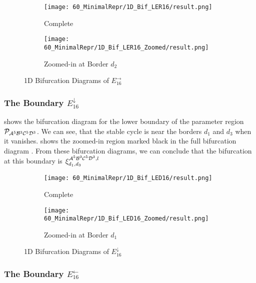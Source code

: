 \begin{figure}
    \centering
    \begin{subfigure}{0.4\textwidth}
        \centering
        \texttt{[image: 60\_MinimalRepr/1D\_Bif\_LER16/result.png]}
        \caption{Complete}
        \label{fig:final.bifurcation.E.right}
    \end{subfigure}
    \begin{subfigure}{0.4\textwidth}
        \centering
        \texttt{[image: 60\_MinimalRepr/1D\_Bif\_LER16\_Zoomed/result.png]}
        \caption{Zoomed-in at Border $d_2$}
        \label{fig:final.bifurcation.E.right.zoomed}
    \end{subfigure}
    \caption{1D Bifurcation Diagrams of $E_{16}^\rightarrow$}
\end{figure}

\subsubsection{The Boundary $E_{16}^\downarrow$}

 shows the bifurcation diagram for the lower boundary of the parameter region $\mathcal{P}_{\mathcal{A}^5\mathcal{B}^3\mathcal{C}^5\mathcal{D}^3}$.
We can see, that the stable cycle is near the borders $d_1$ and $d_3$ when it vanishes.
 shows the zoomed-in region marked black in the full bifurcation diagram .
From these bifurcation diagrams, we can conclude that the bifurcation at this boundary is $\xi_{d_1, d_3}^{\mathcal{A}^5\mathcal{B}^3\mathcal{C}^5\mathcal{D}^3, l}$

\begin{figure}
    \centering
    \begin{subfigure}{0.4\textwidth}
        \centering
        \texttt{[image: 60\_MinimalRepr/1D\_Bif\_LED16/result.png]}
        \caption{Complete}
        \label{fig:final.bifurcation.E.down}
    \end{subfigure}
    \begin{subfigure}{0.4\textwidth}
        \centering
        \texttt{[image: 60\_MinimalRepr/1D\_Bif\_LED16\_Zoomed/result.png]}
        \caption{Zoomed-in at Border $d_1$}
        \label{fig:final.bifurcation.E.down.zoomed}
    \end{subfigure}
    \caption{1D Bifurcation Diagrams of $E_{16}^\downarrow$}
\end{figure}

\subsubsection{The Boundary $E_{16}^\leftarrow$}

